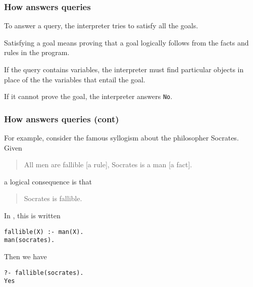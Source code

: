  
%
\begin{frame}
\frametitle{How \Prolog answers queries}

To answer a query, the \Prolog interpreter tries to satisfy all the
goals.

\bigskip

Satisfying a goal means proving that a goal logically follows from the
facts and rules in the program.

\bigskip

If the query contains variables, the interpreter must find particular
objects in place of the the variables that entail the goal.

\bigskip

If it cannot prove the goal, the interpreter answers \texttt{No}.

\end{frame}

%
\begin{frame}[containsverbatim]
\frametitle{How \Prolog answers queries (cont)}

For example, consider the famous syllogism about the philosopher
Socrates. Given
\begin{quote}
All men are fallible [a rule],
Socrates is a man [a fact].
\end{quote}
a logical consequence is that
\begin{quote}
Socrates is fallible.
\end{quote}
In \Prolog, this is written
{\small
\begin{verbatim}
fallible(X) :- man(X).
man(socrates).
\end{verbatim}
}
Then we have
{\small
\begin{verbatim}
?- fallible(socrates).
Yes
\end{verbatim}
}

\end{frame}

